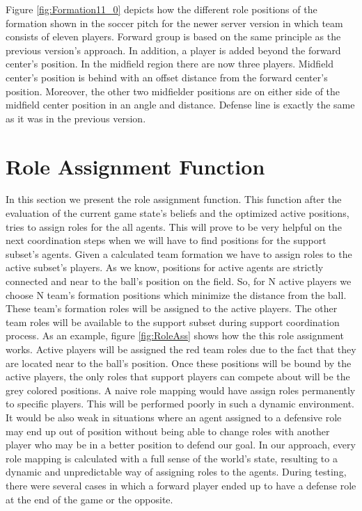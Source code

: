 Figure \ref{fig:Formation11_0} depicts how the different role positions of the formation shown in the soccer pitch for the newer server version in which team consists of eleven players. Forward group is based on the same principle as the previous version's approach. In addition, a player is added beyond the forward center's position. In the midfield region there are now three players. Midfield center's position is behind with an offset distance from the forward center's position. Moreover, the other two midfielder positions are on either side of the midfield center position in an angle and distance. Defense line is exactly the same as it was in the previous version.

\section{Role Assignment Function}
In this section we present the role assignment function. This function after the evaluation of the current game state's beliefs and the optimized active positions, tries to assign roles for the all agents. This will prove to be very helpful on the next coordination steps when we will have to find positions for the support subset's agents. Given a calculated team formation we have to assign roles to the active subset's players. As we know, positions for active agents are strictly connected and near to the ball's position on the field. So, for N active players we choose N team's formation positions which minimize the distance from the ball. These team's formation roles will be assigned to the active players. The other team roles will be available to the support subset during support coordination process. As an example, figure \ref{fig:RoleAss} shows how the this role assignment works. Active players will be assigned the red team roles due to the fact that they are located near to the ball's position. Once these positions will be bound by the active players, the only roles that support players can compete about will be the grey colored positions. A naive role mapping would have assign roles permanently to specific players. This will be performed poorly in such a dynamic environment. It would be also weak in situations where an agent assigned to a defensive role may end up out of position without being able to change roles with another player who may be in a better position to defend our goal. In our approach, every role mapping is calculated with a full sense of the world's state, resulting to a dynamic and unpredictable way of assigning roles to the agents. During testing, there were several cases in which a forward player ended up to have a defense role at the end of the game or the opposite.

